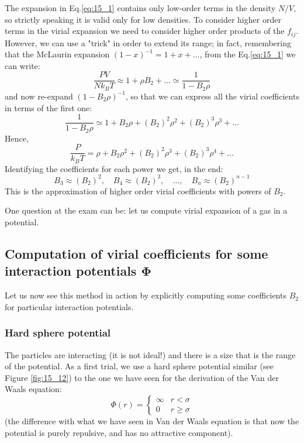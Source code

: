 \documentclass[../main/main.tex]{subfiles}
\begin{document}
The expansion in Eq.\eqref{eq:15_1} contains only low-order terms in the density \( N/V \), so strictly speaking it is valid only for low densities. To consider higher order terms in the virial expansion we need to consider higher order products of the \( f_{ij} \).
However, we can use a "trick" in order to extend its range; in fact, remembering that the McLaurin expansion \(  (1-x)^{-1} = 1 + x + \dots \), from the Eq.\eqref{eq:15_1} we can write:
\begin{equation*}
  \frac{PV}{N k_B T} \approx 1 + \rho B_2 + \dots \simeq \frac{1}{1-B_2 \rho }
\end{equation*}
and now re-expand \( (1-B_2 \rho )^{-1} \), so that we can express all the virial coefficients in terms of the first one:
\begin{equation*}
  \frac{1}{1-B_2 \rho } \simeq  1 + B_2 \rho + (B_2)^2 \rho ^2  + (B_2)^3 \rho ^3 + \dots
\end{equation*}
Hence,
\begin{equation*}
  \frac{P}{k_B T} = \rho  + B_2 \rho ^2 + (B_2)^2 \rho ^3 + (B_2)^3 \rho ^4 + \dots
\end{equation*}
Identifying the coefficients for each power we get, in the end:
\begin{equation*}
  B_3 \approx (B_2)^2, \quad B_4 \approx (B_2)^3, \quad \dots, \quad B_n \approx (B_2)^{n-1}
\end{equation*}
This is the approximation of higher order virial coefficients with powers of \( B_2 \).
\begin{remark}
One question at the exam can be: let us compute virial expansion of a gas in a potential.
\end{remark}


\subsection{ Computation of virial coefficients for some interaction potentials \( \pmb{\Phi } \)}
Let us now see this method in action by explicitly computing some coefficients \( B_2 \) for particular interaction potentials.

\subsubsection{Hard sphere potential}
The particles are interacting (it is not ideal!) and there is a size that is the range of the potential.
As a first trial, we use a hard sphere potential similar (see Figure \ref{fig:15_12}) to the one we have seen for the derivation of the Van der Waals equation:
\begin{equation}
  \Phi (r) = \begin{cases}
    \infty & r < \sigma \\
    0     & r \ge \sigma
\end{cases}
\end{equation}
(the difference with what we have seen in Van der Waals equation is that now the potential is purely repulsive, and has no attractive component).
\end{document}
